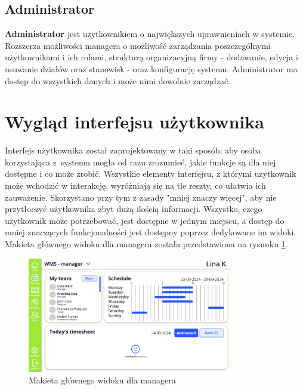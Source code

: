 \subsection{Administrator}

\textbf{Administrator} jest użytkownikiem o największych uprawnieniach w systemie. Rozszerza możliwości managera o możliwość zarządzania poszczególnymi użytkownikami i ich rolami, strukturą organizacyjną firmy - dodawanie, edycja i usuwanie działów oraz stanowisk - oraz konfigurację systemu. Administrator ma dostęp do wszystkich danych i może nimi dowolnie zarządzać.

\section{Wygląd interfejsu użytkownika}

Interfejs użytkownika został zaprojektowany w taki sposób, aby osoba korzystająca z~systemu mogła od razu zrozumieć, jakie funkcje są dla niej dostępne i co może zrobić. Wszystkie elementy interfejsu, z którymi użytkownik może wchodzić w interakcję, wyróżniają się na tle reszty, co ułatwia ich zauważenie. Skorzystano przy tym z zasady "mniej znaczy więcej", aby nie przytłoczyć użytkownika zbyt dużą ilością informacji. Wszystko, czego użytkownik może potrzebować, jest dostępne w jednym miejscu, a dostęp do mniej znaczących funkcjonalności jest dostępny poprzez dedykowane im widoki. Makieta głównego widoku dla managera została przedstawiona na rysunku \ref{fig:mainLayout}.

\begin{figure}[H]
    \centering
    \includegraphics[width=0.8\textwidth, frame]{graf/mainLayout.png}
    \caption{Makieta głównego widoku dla managera}
    \label{fig:mainLayout}
\end{figure}

